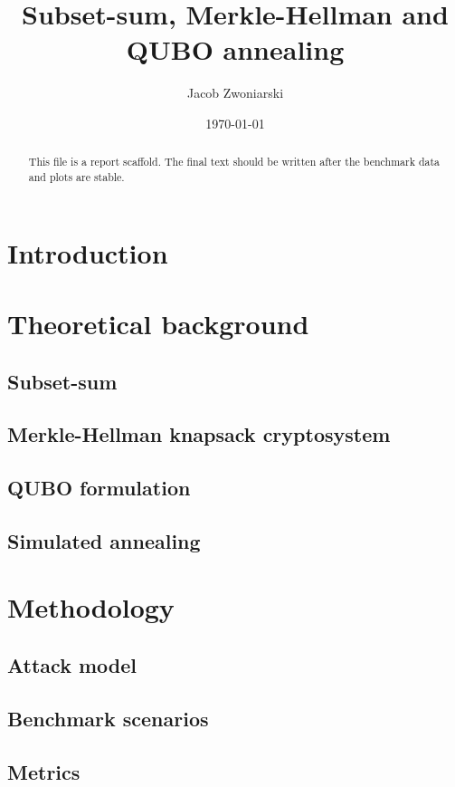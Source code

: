 \documentclass[11pt,a4paper]{article}
\title{Subset-sum, Merkle-Hellman and QUBO annealing}
\author{Jacob Zwoniarski}
\date{\today}
\begin{document}
\maketitle

\begin{abstract}
This file is a report scaffold. The final text should be written after the
benchmark data and plots are stable.
\end{abstract}

\section{Introduction}

\section{Theoretical background}

\subsection{Subset-sum}

\subsection{Merkle-Hellman knapsack cryptosystem}

\subsection{QUBO formulation}

\subsection{Simulated annealing}

\section{Methodology}

\subsection{Attack model}

\subsection{Benchmark scenarios}

\subsection{Metrics}
\end{document}
